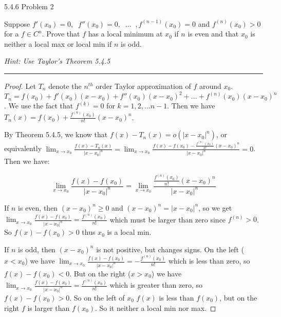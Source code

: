 \documentclass[11pt]{article}
\renewcommand{\sp}{\; \;}
\begin{document}
 5.4.6 Problem 2

Suppose $f'(x_0) = 0, \sp f''(x_0) = 0, \sp ... \sp, f^{(n-1)}(x_0) = 0$ and $f^{(n)} (x_0) > 0$ for a $f \in C^n$. Prove that $f$ has a local minimum at $x_0$ if $n$ is even and that $x_0$ is neither a local max or local min if $n$ is odd. 

\textit{Hint: Use Taylor's Theorem 5.4.5}
\hrule 


\begin{proof}

Let $T_n$ denote the $n^{th}$ order Taylor approximation of $f$ around $x_0$. 
$T_n = f(x_0) + f'(x_0) (x - x_0) + f''(x_0) (x - x_0)^2 + ... + f^{(n)}(x_0) (x - x_0)^n$. We use the fact that $f^{(k)} = 0$ for $k = 1, 2, ... n-1$. 
Then we have $T_n(x) = f(x_0) + \frac{f^{(n)}(x_0)}{n!} (x - x_0)^n$. 

By Theorem 5.4.5, we know that $f(x) - T_n(x) = o(|x-x_0|^n)$, or equivalently 
$\lim_{x \to x_0} \frac{f(x) - T_n(x)}{|x-x_0|^n} = \lim_{x \to x_0} \frac{f(x) - f(x_0) - \frac{f^{(n)}(x_0)}{n!} (x - x_0)^n}{|x-x_0|^n} = 0$. Then we have:

$$\lim_{x \to x_0} \frac{f(x) - f(x_0)}{|x-x_0|^n} = \lim_{x \to x_0} \frac{\frac{f^{(n)}(x_0)}{n!} (x - x_0)^n}{|x-x_0|^n}$$

If $n$ is even, then $(x - x_0)^n \geq 0$ and $(x - x_0)^n = |x - x_0|^n$, so we get $\lim_{x \to x_0} \frac{f(x) - f(x_0)}{|x-x_0|^n} = \frac{f^{(n)}(x_0)}{n!}$ which must be larger than zero since $f^{(n)} > 0$. So $f(x) - f(x_0) > 0$ thus $x_0$ is a local min. 

If $n$ is odd, then $(x - x_0)^n$ is not positive, but changes signs. 
On the left ($x < x_0$) we have $\lim_{x \to x_0} \frac{f(x) - f(x_0)}{|x-x_0|^n} = -\frac{f^{(n)}(x_0)}{n!}$ which is less than zero, so $f(x) - f(x_0) < 0$. 
But on the right ($x > x_0$) we have $\lim_{x \to x_0} \frac{f(x) - f(x_0)}{|x-x_0|^n} = \frac{f^{(n)}(x_0)}{n!}$ which is greater than zero, so $f(x) - f(x_0) > 0$. 
So on the left of $x_0$ $f(x)$ is less than $f(x_0)$, but on the right $f$ is larger than $f(x_0)$. So it neither a local min nor max.



\end{proof}
\end{document}
